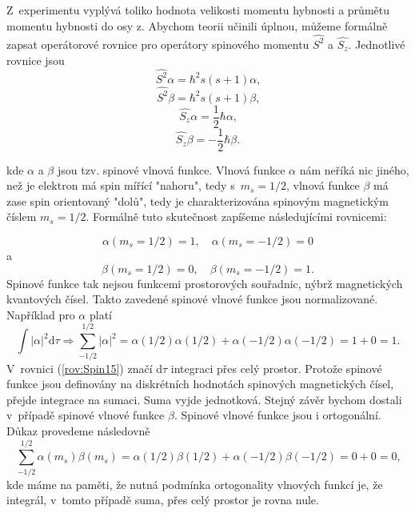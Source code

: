 Z~experimentu vyplývá toliko hodnota velikosti momentu hybnosti a průmětu momentu hybnosti do osy z. Abychom teorii učinili úplnou, můžeme formálně zapsat operátorové rovnice pro operátory spinového momentu $\hat{S^2}$ a $\hat{S_z}$. Jednotlivé rovnice jsou
\begin{equation}
\hat{S^2}\alpha = \hbar^2 s(s+1)\alpha \mbox{,}
\label{rov:Spin17}
\end{equation}
\begin{equation}
\hat{S^2}\beta = \hbar^2 s(s+1)\beta \mbox{,}
\label{rov:Spin18}
\end{equation}
\begin{equation}
\hat{S_z}\alpha= \frac{1}{2}\hbar \alpha \mbox{,}
\label{rov:Spin19}
\end{equation}
\begin{equation}
\hat{S_z}\beta= -\frac{1}{2}\hbar \beta \mbox{.}
\label{rov:Spin20}
\end{equation}

\noindent kde $\alpha$ a $\beta$ jsou tzv. spinové vlnová funkce. Vlnová funkce $\alpha$ nám neříká nic jiného, než je elektron má spin mířící "nahoru", tedy s~$m_s=1/2$, vlnová funkce $\beta$ má zase spin orientovaný "dolů", tedy je charakterizována spinovým magnetickým číslem  $m_s=1/2$. Formálně tuto skutečnost zapíšeme následujícími rovnicemi: 

\begin{equation}
\alpha(m_s=1/2)=1, \quad \alpha(m_s=-1/2)=0
\label{rov:Spin13}
\end{equation}
a
\begin{equation}
\beta(m_s=1/2)=0,  \quad \beta(m_s=-1/2)=1 \mbox{.}
\label{rov:Spin14}
\end{equation}
Spinové funkce tak nejsou funkcemi prostorových souřadnic, nýbrž magnetických kvantových čísel. Takto zavedené spinové vlnové funkce jsou normalizované. Například pro $\alpha$ platí
\begin{equation}
\int |\alpha|^2 \mathrm{d}\tau \Rightarrow \sum_{-1/2}^{1/2}|\alpha|^2 = \alpha(1/2) \alpha(1/2) + \alpha(-1/2)\alpha(-1/2) = 1 + 0 = 1 \mbox{.}
\label{rov:Spin15}
\end{equation}
V~rovnici (\ref{rov:Spin15}) značí $\mathrm{d}\tau$ integraci přes celý prostor. Protože spinové funkce jsou definovány na diskrétních hodnotách spinových magnetických čísel, přejde integrace na sumaci. Suma vyjde jednotková. Stejný závěr bychom dostali v~případě spinové vlnové funkce $\beta$. Spinové vlnové funkce jsou i ortogonální. Důkaz provedeme následovně
\begin{equation}
\sum_{-1/2}^{1/2} \alpha(m_s) \beta(m_s) = \alpha(1/2) \beta(1/2) + \alpha(-1/2) \beta(-1/2) = 0 + 0 = 0 \mbox{,}
\label{rov:Spin16}
\end{equation}
kde máme na paměti, že nutná podmínka ortogonality vlnových funkcí je, že integrál, v~tomto případě suma, přes celý prostor je rovna nule.

